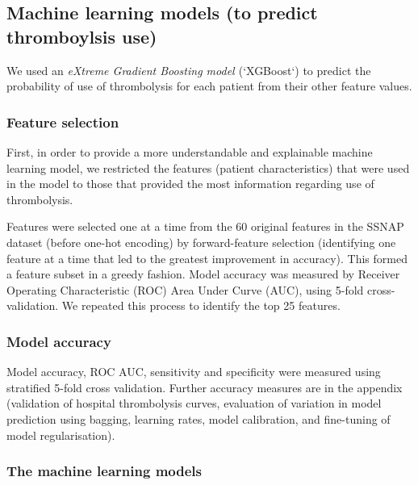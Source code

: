\subsection{Machine learning models (to predict thromboylsis use)}
We used an \emph{eXtreme Gradient Boosting model \cite{chen_xgboost_2016}} (`XGBoost`) to predict the probability of use of thrombolysis for each patient from their other feature values.

\subsubsection{Feature selection}
First, in order to provide a more understandable and explainable machine learning model, we restricted the features (patient characteristics) that were used in the model to those that provided the most information regarding use of thrombolysis. 

Features were selected one at a time from the 60 original features in the SSNAP dataset (before one-hot encoding) by forward-feature selection (identifying one feature at a time that led to the greatest improvement in accuracy). This formed a feature subset in a greedy fashion. Model accuracy was measured by Receiver Operating Characteristic (ROC) Area Under Curve (AUC), using 5-fold cross-validation. We repeated this process to identify the top 25 features.


\subsubsection{Model accuracy}
Model accuracy, ROC AUC, sensitivity and specificity were measured using stratified 5-fold cross validation. Further accuracy measures are in the appendix (validation of hospital thrombolysis curves, evaluation of variation in model prediction using bagging, learning rates, model calibration, and
fine-tuning of model regularisation).

\subsubsection{The machine learning models}

